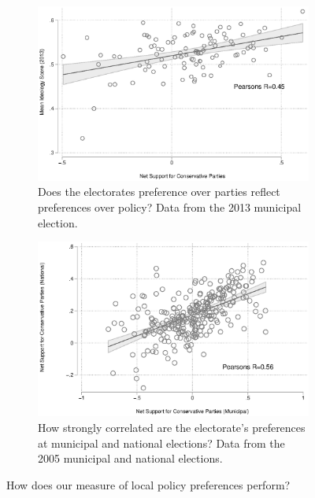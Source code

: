 \documentclass[a4paper,12pt]{article}
\begin{document}
\begin{figure}
	\begin{subfigure}{0.45\textwidth}
	\includegraphics[width=1\textwidth]{validation.eps}
	\caption{Does the electorates preference over parties reflect preferences over policy? Data from the 2013 municipal election.} \label{validation1}
	\end{subfigure}  \hfill
	\begin{subfigure}{0.45\textwidth}
	\includegraphics[width=1\textwidth]{validation2.eps}
	\caption{How strongly correlated are the electorate's preferences at municipal and national elections? Data from the 2005 municipal and national elections.} \label{validation2}
\end{subfigure}
\caption{How does our measure of local policy preferences perform?}
\end{figure}
\end{document}
